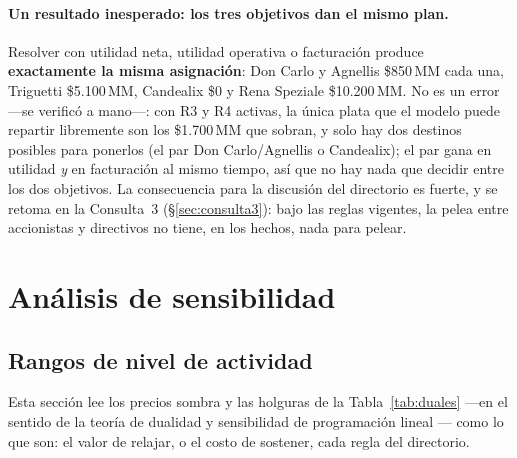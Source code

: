 \documentclass[10pt,a4paper]{article}
\begin{document}
\paragraph{Un resultado inesperado: los tres objetivos dan el mismo plan.}
Resolver con utilidad neta, utilidad operativa o facturación produce
\textbf{exactamente la misma asignación}: Don Carlo y Agnellis \$850\,MM cada
una, Triguetti \$5.100\,MM, Candealix \$0 y Rena Speziale \$10.200\,MM. No es
un error —se verificó a mano—: con R3 y R4 activas, la única plata que el
modelo puede repartir libremente son los \$1.700\,MM que sobran, y solo hay
dos destinos posibles para ponerlos (el par Don Carlo/Agnellis o Candealix); el
par gana en utilidad \emph{y} en facturación al mismo tiempo, así que no hay
nada que decidir entre los dos objetivos. La consecuencia para la discusión
del directorio es fuerte, y se retoma en la Consulta~3
(\S\ref{sec:consulta3}): bajo las reglas vigentes, la pelea entre accionistas
y directivos no tiene, en los hechos, nada para pelear.

\section{Análisis de sensibilidad}
\label{sec:sensibilidad}

\subsection{Rangos de nivel de actividad}
\label{sec:b1}

Esta sección lee los precios sombra y las holguras de la Tabla~\ref{tab:duales}
—en el sentido de la teoría de dualidad y sensibilidad de programación lineal
\cite{hillier}— como lo que son: el valor de relajar, o el costo de sostener,
cada regla del directorio.
\end{document}

